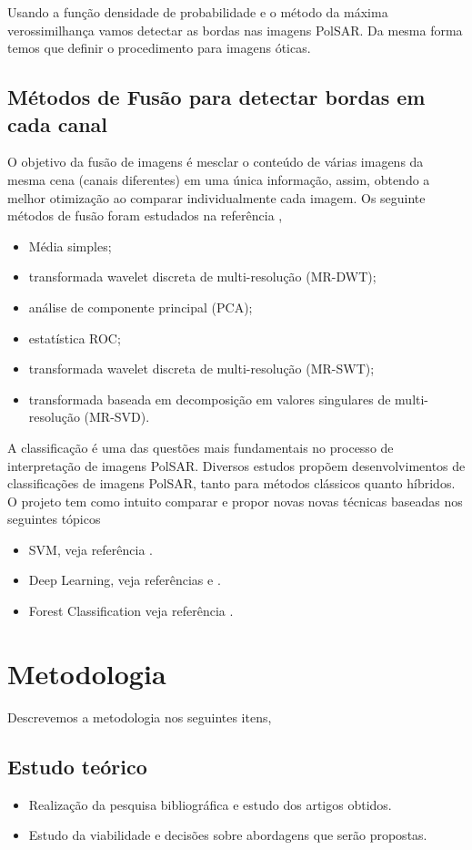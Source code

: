 \documentclass[runningheads]{llncs}
\begin{document}
Usando a função densidade de probabilidade e o método da máxima verossimilhança vamos detectar as bordas nas imagens PolSAR. Da mesma forma temos que definir o procedimento para imagens óticas. 
\subsection{Métodos de Fusão para detectar bordas em cada canal}
 O objetivo da fusão de imagens é mesclar o conteúdo de várias imagens da mesma cena (canais diferentes) em uma única informação, assim, obtendo a melhor otimização ao comparar individualmente cada imagem. Os seguinte métodos de fusão foram estudados na referência \cite{bmf_2020},
\begin{itemize}
  \item Média simples;
  \item transformada wavelet discreta de multi-resolução (MR-DWT);
  \item análise de componente principal (PCA);
  \item estatística ROC;
  \item transformada wavelet discreta de multi-resolução (MR-SWT);
  \item transformada baseada em decomposição em valores singulares de multi-resolução (MR-SVD).
\end{itemize}

A classificação é uma das questões mais fundamentais no
processo de interpretação de imagens PolSAR. Diversos estudos propõem desenvolvimentos de classificações de imagens PolSAR, tanto para métodos clássicos quanto híbridos. O projeto tem como intuito comparar e propor novas novas técnicas baseadas nos seguintes tópicos 
\begin{itemize}
  \item SVM, veja referência \cite{ref_proc1}.
  \item Deep Learning, veja referências \cite{ref_proc3} e \cite{ztmxzxf}.
  \item Forest Classification veja referência \cite{ref_proc1}.
\end{itemize}

\section{Metodologia}
Descrevemos a metodologia nos seguintes itens,
\subsection{Estudo teórico}
\begin{itemize}
  \item Realização da pesquisa bibliográfica e estudo dos artigos obtidos.
  \item Estudo da viabilidade e decisões sobre abordagens que serão propostas.
\end{itemize}
\end{document}
